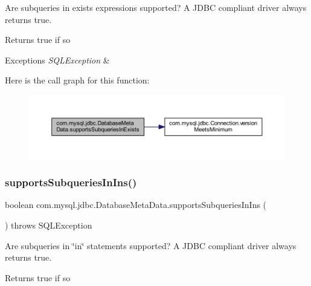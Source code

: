 Are subqueries in exists expressions supported? A J\+D\+BC compliant driver always returns true.

\begin{DoxyReturn}{Returns}
true if so 
\end{DoxyReturn}

\begin{DoxyExceptions}{Exceptions}
{\em S\+Q\+L\+Exception} & \\
\hline
\end{DoxyExceptions}
Here is the call graph for this function\+:
\nopagebreak
\begin{figure}[H]
\begin{center}
\leavevmode
\includegraphics[width=350pt]{classcom_1_1mysql_1_1jdbc_1_1_database_meta_data_a211baae4eb6447aa3a4c7b15190ebce4_cgraph}
\end{center}
\end{figure}
\mbox{\label{classcom_1_1mysql_1_1jdbc_1_1_database_meta_data_a66302a5e773430272b72475fadeb5060}} 
\subsubsection{\texorpdfstring{supports\+Subqueries\+In\+Ins()}{supportsSubqueriesInIns()}}
{\footnotesize\ttfamily boolean com.\+mysql.\+jdbc.\+Database\+Meta\+Data.\+supports\+Subqueries\+In\+Ins (\begin{DoxyParamCaption}{ }\end{DoxyParamCaption}) throws S\+Q\+L\+Exception}

Are subqueries in \char`\"{}in\char`\"{} statements supported? A J\+D\+BC compliant driver always returns true.

\begin{DoxyReturn}{Returns}
true if so 
\end{DoxyReturn}

